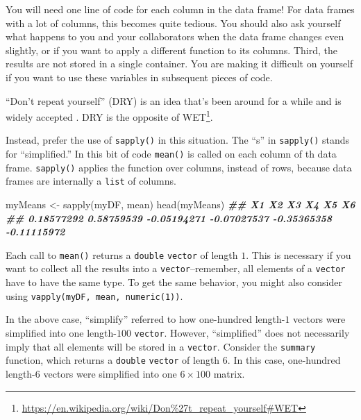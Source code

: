 \documentclass[
  12pt,
  krantz2]{krantz}
\makeatletter
\newenvironment{Shaded}{\begin{snugshade}}{\end{snugshade}}
\newcommand{\DocumentationTok}[1]{\textcolor[rgb]{0.37,0.37,0.37}{\textbf{\textit{#1}}}}
\newcommand{\FunctionTok}[1]{\textcolor[rgb]{0,0,0}{#1}}
\newcommand{\NormalTok}[1]{#1}
\newcommand{\OtherTok}[1]{\textcolor[rgb]{0.37,0.37,0.37}{#1}}
\renewcommand{\href}[2]{#2\footnote{\url{#1}}}
\newenvironment{kframe}{%
\medskip{}
\setlength{\fboxsep}{.8em}
 \def\at@end@of@kframe{}%
 \ifinner\ifhmode%
  \def\at@end@of@kframe{\end{minipage}}%
  \begin{minipage}{\columnwidth}%
 \fi\fi%
 \def\FrameCommand##1{\hskip\@totalleftmargin \hskip-\fboxsep
 \colorbox{shadecolor}{##1}\hskip-\fboxsep
     \hskip-\linewidth \hskip-\@totalleftmargin \hskip\columnwidth}%
 \MakeFramed {\advance\hsize-\width
   \@totalleftmargin\z@ \linewidth\hsize
   \@setminipage}}%
 {\par\unskip\endMakeFramed%
 \at@end@of@kframe}
\renewenvironment{Shaded}{\begin{kframe}}{\end{kframe}}
\makeatother
\begin{document}
You will need one line of code for each column in the data frame! For data frames with a lot of columns, this becomes quite tedious. You should also ask yourself what happens to you and your collaborators when the data frame changes even slightly, or if you want to apply a different function to its columns. Third, the results are not stored in a single container. You are making it difficult on yourself if you want to use these variables in subsequent pieces of code.

``Don't repeat yourself'' (DRY) is an idea that's been around for a while and is widely accepted \citep{hunt2000pragmatic}. DRY is the opposite of \href{https://en.wikipedia.org/wiki/Don\%27t_repeat_yourself\#WET}{WET}.

Instead, prefer the use of \texttt{sapply()} in this situation. The ``s'' in \texttt{sapply()} stands for ``simplified.'' In this bit of code \texttt{mean()} is called on each column of th data frame. \texttt{sapply()} applies the function over columns, instead of rows, because data frames are internally a \texttt{list} of columns.

\begin{Shaded}
\begin{Highlighting}[]
\NormalTok{myMeans }\OtherTok{\textless{}{-}} \FunctionTok{sapply}\NormalTok{(myDF, mean)}
\FunctionTok{head}\NormalTok{(myMeans)}
\DocumentationTok{\#\#          X1          X2          X3          X4          X5          X6 }
\DocumentationTok{\#\#  0.18577292  0.58759539 {-}0.05194271 {-}0.07027537 {-}0.35365358 {-}0.11115972}
\end{Highlighting}
\end{Shaded}

Each call to \texttt{mean()} returns a \texttt{double} \texttt{vector} of length \(1\). This is necessary if you want to collect all the results into a \texttt{vector}--remember, all elements of a \texttt{vector} have to have the same type. To get the same behavior, you might also consider using \texttt{vapply(myDF,\ mean,\ numeric(1))}.

In the above case, ``simplify'' referred to how one-hundred length-\(1\) vectors were simplified into one length-\(100\) \texttt{vector}. However, ``simplified'' does not necessarily imply that all elements will be stored in a \texttt{vector}. Consider the \texttt{summary} function, which returns a \texttt{double} \texttt{vector} of length \(6\). In this case, one-hundred length-\(6\) vectors were simplified into one \(6 \times 100\) matrix.
\end{document}
